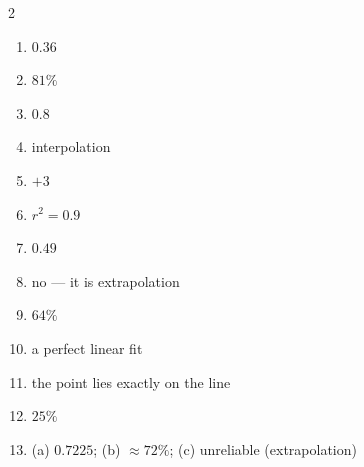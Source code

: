 \documentclass[11pt]{article}
\begin{document}
\begin{keybox}
\begin{multicols}{2}
\small
\begin{enumerate}[leftmargin=*,itemsep=3pt]
  \item $0.36$
  \item $81\%$
  \item $0.8$
  \item interpolation
  \item $+3$
  \item $r^{2}=0.9$
  \item $0.49$
  \item no --- it is extrapolation
  \item $64\%$
  \item a perfect linear fit
  \item the point lies exactly on the line
  \item $25\%$
  \item (a) $0.7225$; (b) $\approx72\%$; (c) unreliable (extrapolation)
\end{enumerate}
\end{multicols}
\end{keybox}
\end{document}
